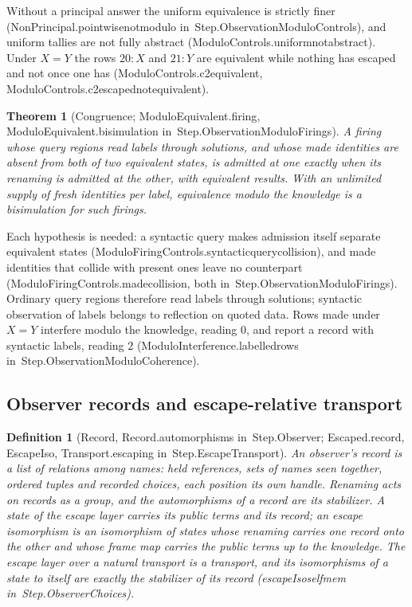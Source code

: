 \documentclass[11pt]{article}
\newtheorem{definition}{Definition}
\newtheorem{theorem}{Theorem}
\theoremstyle{remark}
\newcommand{\lean}[1]{{\ttfamily\def\_{\textunderscore\allowbreak}#1}}
\newcommand{\inmod}[1]{in~{\ttfamily\def\_{\textunderscore\allowbreak}#1}}
\begin{document}
Without a principal answer the uniform equivalence is strictly finer
(\lean{NonPrincipal.pointwise\_not\_modulo} \inmod{Step.ObservationModuloControls}), and uniform tallies are
not fully abstract (\lean{ModuloControls.uniform\_not\_abstract}). Under $X = Y$ the rows $20 : X$ and $21 :
Y$ are equivalent while nothing has escaped and not once one has (\lean{ModuloControls.c2\_equivalent},
\lean{ModuloControls.c2\_escaped\_not\_equivalent}).

\begin{theorem}[Congruence; \lean{ModuloEquivalent.firing}, \lean{ModuloEquivalent.bisimulation} \inmod{Step.ObservationModuloFirings}]
A firing whose query regions read labels through solutions, and whose made identities are absent from
both of two equivalent states, is admitted at one exactly when its renaming is admitted at the other,
with equivalent results. With an unlimited supply of fresh identities per label, equivalence modulo the
knowledge is a bisimulation for such firings.
\end{theorem}

Each hypothesis is needed: a syntactic query makes admission itself separate equivalent states
(\lean{ModuloFiringControls.syntactic\_query\_collision}), and made identities that collide with present ones
leave no counterpart (\lean{ModuloFiringControls.made\_collision}, both \inmod{Step.ObservationModuloFirings}). Ordinary query regions therefore read
labels through solutions; syntactic observation of labels belongs to reflection on quoted data. Rows
made under $X = Y$ interfere modulo the knowledge, reading $0$, and report a record with syntactic labels,
reading $2$ (\lean{ModuloInterference.labelled\_rows} \inmod{Step.ObservationModuloCoherence}).

\subsection{Observer records and escape-relative transport}

\begin{definition}[\lean{Record}, \lean{Record.automorphisms} \inmod{Step.Observer}; \lean{Escaped.record}, \lean{EscapeIso}, \lean{Transport.escaping} \inmod{Step.EscapeTransport}]
An observer's \emph{record} is a list of relations among names: held references, sets of names seen
together, ordered tuples and recorded choices, each position its own handle. Renaming acts on records
as a group, and the automorphisms of a record are its stabilizer. A state of the escape layer carries
its public terms and its record; an \emph{escape isomorphism} is an isomorphism of states whose renaming
carries one record onto the other and whose frame map carries the public terms up to the knowledge. The
escape layer over a natural transport is a transport, and its isomorphisms of a state to itself are exactly the
stabilizer of its record (\lean{escapeIso\_self\_mem} \inmod{Step.ObserverChoices}).
\end{definition}
\end{document}
